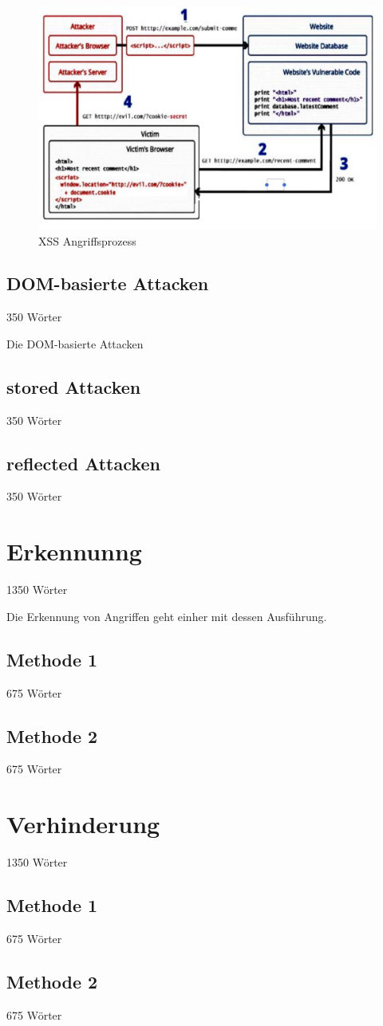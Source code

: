 \begin{figure}[ht]
	\centering
	\includegraphics[width=0.75\linewidth]{images/XSS-attack-process.png}
	\caption{XSS Angriffsprozess}
\end{figure}




\subsection{DOM-basierte Attacken}
\label{subsection:DOM-based Attacks} 350 Wörter

Die DOM-basierte Attacken

\subsection{stored Attacken}
\label{subsection:stored attacks} 350 Wörter


\subsection{reflected Attacken}
\label{subsection:reflective attacks} 350 Wörter


\section{Erkennunng}
\label{section:Detection} 1350 Wörter

Die Erkennung von Angriffen geht einher mit dessen Ausführung.

\subsection{Methode 1}
\label{subsection:Method1} 675 Wörter

\subsection{Methode 2}
\label{subsection:Method2} 675 Wörter

\section{Verhinderung} 1350 Wörter
\label{section:Prevention}

\subsection{Methode 1}
\label{subsection:Method1} 675 Wörter

\subsection{Methode 2}
\label{subsection:Method2} 675 Wörter
